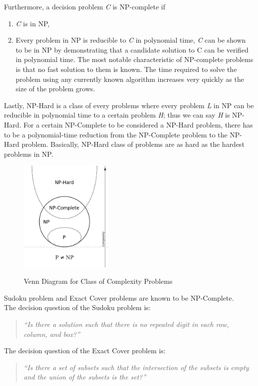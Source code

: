 \documentclass[a4paper,oneside,11pt]{report}
\newcounter{row}
\newcounter{col}
\begin{document}
Furthermore, a decision problem \emph{C} is NP-complete if
\begin{enumerate}
\item \emph{C} is in NP,
\item Every problem in NP is reducible to \emph{C} in polynomial time, \emph{C} can be shown to be in NP by demonstrating that a candidate solution to C can be verified in polynomial time. The most notable characteristic of NP-complete problems is that no fast solution to them is known. The time required to solve the problem using any currently known algorithm increases very quickly as the size of the problem grows.
\end{enumerate}
Lastly, NP-Hard is a class of every problems where every problem \emph{L} in NP can be reducible in polynomial time to a certain problem \emph{H}; thus we can say \emph{H} is NP-Hard. For a certain NP-Complete to be considered a NP-Hard problem, there has to be a polynomial-time reduction from the NP-Complete problem to the NP-Hard problem. Basically, NP-Hard class of problems are as hard as the hardest problems in NP.\\
\begin{figure}[h]
  \centering
  {\includegraphics[width=0.4\textwidth]{venndiagram.jpg}\label{fig:venndiagram}}
  \caption{Venn Diagram for Class of Complexity Problems}
\end{figure}
\newpage
Sudoku problem and Exact Cover problems are known to be NP-Complete.\\

The decision question of the Sudoku problem is:
\begin{quote}
\textit{``Is there a solution such that there is no repeated digit in each row, column, and box?''}
\end{quote}

The decision question of the Exact Cover problem is:
\begin{quote}
\textit{``Is there a set of subsets such that the intersection of the subsets is empty and the union of the subsets is the set?''}
\end{quote}
\end{document}
